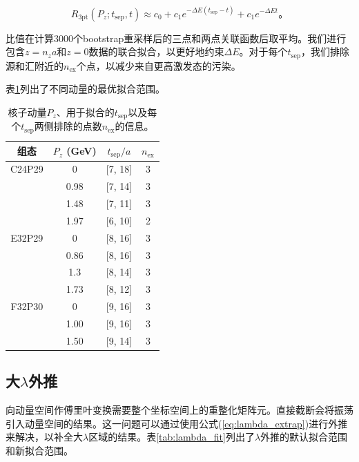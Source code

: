 \documentclass[12pt,a4paper]{ctexart}
\begin{document}
\begin{equation}
R_{\text{3pt}}(P_z; t_{\text{sep}}, t) \approx c_0 + c_1 e^{-\Delta E (t_{\text{sep}}-t)} + c_1 e^{-\Delta E t}。
\label{eq:ratio_fit_simple}
\end{equation}

比值在计算3000个bootstrap重采样后的三点和两点关联函数后取平均。我们进行包含$z = n_z a$和$z = 0$数据的联合拟合，以更好地约束$\Delta E$。对于每个$t_{\text{sep}}$，我们排除源和汇附近的$n_{\text{ex}}$个点，以减少来自更高激发态的污染。

表\ref{tab:fitting_ranges}列出了不同动量的最优拟合范围。

\begin{table}[H]
\centering
\caption{核子动量$P_z$、用于拟合的$t_{\text{sep}}$以及每个$t_{\text{sep}}$两侧排除的点数$n_{\text{ex}}$的信息。}
\label{tab:fitting_ranges}
\begin{tabular}{cccc}
\toprule
组态 & $P_z$ (GeV) & $t_{\text{sep}}/a$ & $n_{\text{ex}}$ \\
\midrule
C24P29 & 0     & [7, 18] & 3 \\
        & 0.98  & [7, 14] & 3 \\
        & 1.48  & [7, 11] & 3 \\
        & 1.97  & [6, 10] & 2 \\
\midrule
E32P29 & 0     & [8, 16] & 3 \\
        & 0.86  & [8, 16] & 3 \\
        & 1.3   & [8, 14] & 3 \\
        & 1.73  & [8, 12] & 3 \\
\midrule
F32P30 & 0     & [9, 16] & 3 \\
        & 1.00  & [9, 16] & 3 \\
        & 1.50  & [9, 14] & 3 \\
\bottomrule
\end{tabular}
\end{table}

\subsection*{大$\lambda$外推}

向动量空间作傅里叶变换需要整个坐标空间上的重整化矩阵元。直接截断会将振荡引入动量空间的结果。这一问题可以通过使用公式(\ref{eq:lambda_extrap})进行外推来解决，以补全大$\lambda$区域的结果。表\ref{tab:lambda_fit}列出了$\lambda$外推的默认拟合范围和新拟合范围。
\end{document}
